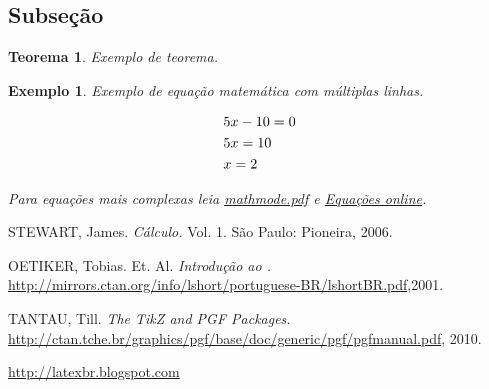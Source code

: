 \documentclass[a4paper]{report} %
\newtheorem{teo}{Teorema}[chapter] %
\newtheorem{ex}{Exemplo}[chapter] %
\begin{document}
\subsection{Subse\c c\~ao}
\label{subsec_nome}

\begin{teo}
Exemplo de teorema.
\end{teo}

\begin{ex}
Exemplo de equa\c c\~ao matem\'atica com m\'ultiplas linhas.

\[
\begin{gathered}
  5x - 10 = 0 \hfill \\
  5x = 10 \hfill \\
  x = 2 \hfill \\ 
\end{gathered} 
\]

Para equa\c c\~oes mais complexas leia \href{http://ctan.tche.br/help/Catalogue/entries/voss-mathmode.html}{mathmode.pdf} e \href{http://latexbr.blogspot.com/2010/11/editor-de-equacoes-online.html}{Equa\c c\~oes online}.
\end{ex}

\begin{thebibliography}{99}
 STEWART, James. {\sl C\'alculo.} Vol. 1. S\~ao Paulo: Pioneira, 2006.

OETIKER, Tobias. Et. Al. {\sl Introdu\c c\~ao ao {\LaTeXe}.}
\url{http://mirrors.ctan.org/info/lshort/portuguese-BR/lshortBR.pdf},2001.

TANTAU, Till. {\sl The TikZ and PGF Packages.}
\url{http://ctan.tche.br/graphics/pgf/base/doc/generic/pgf/pgfmanual.pdf}, 2010.

\url{http://latexbr.blogspot.com}
\end{thebibliography}

\end{document}
